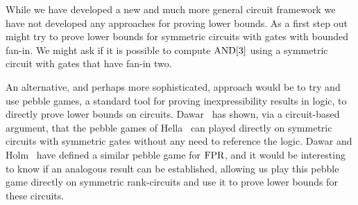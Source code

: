 \documentclass[../paper.tex]{subfiles}
\begin{document}


While we have developed a new and much more general circuit framework we have
not developed any approaches for proving lower bounds. As a first step out might
try to prove lower bounds for symmetric circuits with gates with bounded fan-in.
We might ask if it is possible to compute $\text{\upshape AND}[3]$ using a symmetric circuit
with gates that have fan-in two.

An alternative, and perhaps more sophisticated, approach would be to try and use
pebble games, a standard tool for proving inexpressibility results in logic, to
directly prove lower bounds on circuits. Dawar~\cite{Dawar2016} has shown, via a
circuit-based argument, that the pebble games of Hella~\cite{Hella19961} can
played directly on symmetric circuits with symmetric gates without any need to
reference the logic. Dawar and Holm~\cite{DawarH2012} have defined a similar
pebble game for $\text{\upshape FPR}$, and it would be interesting to know if an analogous
result can be established, allowing us play this pebble game directly on
symmetric rank-circuits and use it to prove lower bounds for these circuits.
\end{document}
